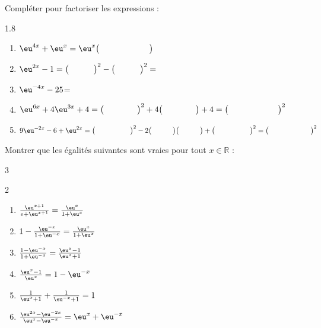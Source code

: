 \documentclass[main.tex]{subfiles}
\begin{document}
\begin{exercise}  Compléter pour factoriser les expressions : \vspace{-0.5em}
	\begin{spacing}{1.8}
		\begin{enumerate}[leftmargin=*,label={}]
			\item $\eu^{4x}+\eu^x=\eu^x\big(\hspace{6em}\big)$
			\item $\eu^{2x}-1= \big(\hspace{3em}\big)^2-\big(\hspace{3em}\big)^2=\dotfill $
			\item $\eu^{-4x}-25$=\dotfill 
			\item $\eu^{6x}+4\eu^{3x}+4=\big(\hspace{4em}\big)^2+4\big(\hspace{4em}\big) +4= \big( \hspace{6em}\big)^2$
			\item $9\eu^{-2x}-6+\eu^{2x}=\big(\hspace{5em}\big)^2-2\big(\hspace{3em}\big)\big(\hspace{3em}\big)+\big(\hspace{5em}\big)^2=\big(\hspace{6em}\big)^2$  
		\end{enumerate}
	\end{spacing}\vspace{-0.75em}
\end{exercise}
\begin{exercise} Montrer que les égalités suivantes sont vraies pour tout $x\in\mathbb{R}$ :
	\vspace{-0.5em}
	\begin{multicols}{3}
		\begin{spacing}{2}
			\begin{enumerate}[leftmargin=*,label={}]
				\item $\frac{\eu^{x+1}}{e+\eu^{x+1}}=\frac{\eu^x}{1+\eu^x}$
				\item $1-\frac{\eu^{-x}}{1+\eu^{-x}}=\frac{\eu^x}{1+\eu^x}$
				\item $\frac{1-\eu^{-x}}{1+\eu^{-x}}=\frac{\eu^x-1}{\eu^x+1}$
				\item $\frac{\eu^x-1}{\eu^x}=1-\eu^{-x}$ 
				\item $\frac{1}{\eu^x+1}+\frac{1}{\eu^{-x}+1}=1$
				\item $\frac{\eu^{2x}-\eu^{-2x}}{\eu^x-\eu^{-x}}=\eu^{x}+\eu^{-x}$
			\end{enumerate}
		\end{spacing}
	\end{multicols} \vspace{-0.75em}
\end{exercise}    
\end{document}
